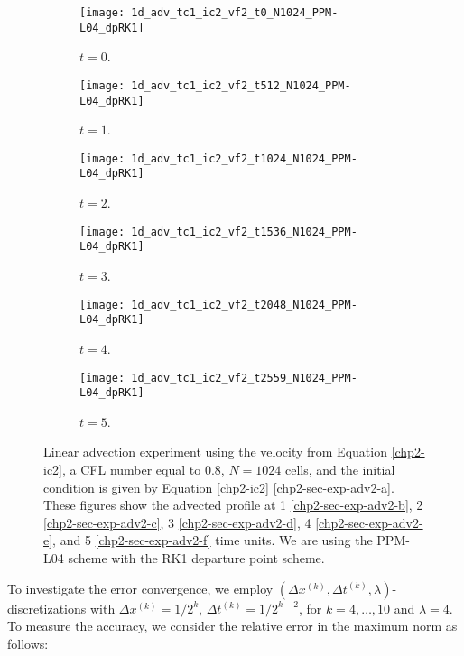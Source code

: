 \begin{figure}[!htb]
	\centering
	\begin{subfigure}{0.3\textwidth}
		\centering
		\texttt{[image: 1d\_adv\_tc1\_ic2\_vf2\_t0\_N1024\_PPM-L04\_dpRK1]}
		\caption{$t=0$.\label{chp2-sec-exp-adv2-a}}
	\end{subfigure}
	\begin{subfigure}{0.3\textwidth}
		\centering
		\texttt{[image: 1d\_adv\_tc1\_ic2\_vf2\_t512\_N1024\_PPM-L04\_dpRK1]}
		\caption{$t=1$.\label{chp2-sec-exp-adv2-b}}
	\end{subfigure}
	\begin{subfigure}{0.3\textwidth}
		\centering
		\texttt{[image: 1d\_adv\_tc1\_ic2\_vf2\_t1024\_N1024\_PPM-L04\_dpRK1]}
		\caption{$t=2$.\label{chp2-sec-exp-adv2-c}}
	\end{subfigure}
	
	\begin{subfigure}{0.3\textwidth}
		\centering
		\texttt{[image: 1d\_adv\_tc1\_ic2\_vf2\_t1536\_N1024\_PPM-L04\_dpRK1]}
		\caption{$t=3$.\label{chp2-sec-exp-adv2-d}}
	\end{subfigure}
	\begin{subfigure}{0.3\textwidth}
		\centering
		\texttt{[image: 1d\_adv\_tc1\_ic2\_vf2\_t2048\_N1024\_PPM-L04\_dpRK1]}
		\caption{$t=4$.\label{chp2-sec-exp-adv2-e}}
	\end{subfigure}
	\begin{subfigure}{0.3\textwidth}
		\centering
		\texttt{[image: 1d\_adv\_tc1\_ic2\_vf2\_t2559\_N1024\_PPM-L04\_dpRK1]}
		\caption{$t=5$.\label{chp2-sec-exp-adv2-f}}
	\end{subfigure}
	\caption{Linear advection experiment using the velocity from Equation \eqref{chp2-ic2},
		a CFL number equal to $0.8$, $N=1024$ cells, and the initial condition is given by 
		Equation \eqref{chp2-ic2} \eqref{chp2-sec-exp-adv2-a}.
		These figures show the advected profile at  1 \eqref{chp2-sec-exp-adv2-b}, 
		2  \eqref{chp2-sec-exp-adv2-c}, 3  \eqref{chp2-sec-exp-adv2-d}, 4  \eqref{chp2-sec-exp-adv2-e},
		and 5  \eqref{chp2-sec-exp-adv2-f} time units.
		We are using the PPM-L04 scheme with the RK1 departure point scheme. \label{chp2-sec-exp-adv2}}
\end{figure}
To investigate the error convergence, we employ $(\Delta x^{(k)}, \Delta t^{(k)}, \lambda)$-discretizations with $\Delta x^{(k)} = 1/2^k$,
 $\Delta t^{(k)}={1}/{2^{k-2}}$, for $k = 4, \ldots, 10$ and $\lambda = 4$.
To measure the accuracy, we consider the relative error in the maximum norm as follows:
